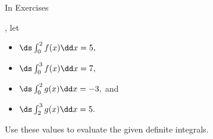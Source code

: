 \begin{exerciseset}{In Exercises}{, let
\begin{itemize}
\item $\ds \int_0^2 f(x)\dd x = 5,$
\item $\ds \int_0^3 f(x) \dd x=7,$
\item $\ds \int_0^2 g(x)\dd x = -3,$ and
\item $\ds \int_2^3 g(x)\dd x = 5.$
\end{itemize}
Use these values to evaluate the given definite integrals.}





\end{exerciseset}
